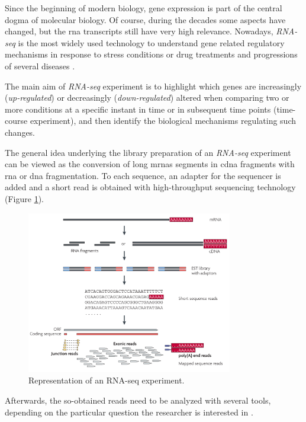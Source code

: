 Since the beginning of modern biology, gene expression is part of the central dogma of molecular biology.
Of course, during the decades some aspects have changed, but the \gls{rna} transcripts still have very high relevance.
Nowadays, \textit{RNA-seq} \cite{Thermes2014, Wang2009, Costa2010, Ozsolak2011} is the most widely used technology to understand gene related regulatory mechanisms in response to stress conditions or drug treatments and progressions of several diseases \cite{Costa2013}.

The main aim of \textit{RNA-seq} experiment is to highlight which genes are increasingly (\textit{up-regulated}) or decreasingly (\textit{down-regulated}) altered when comparing two or more conditions at a specific instant in time or in subsequent time points (time-course experiment), and then identify the biological mechanisms regulating such changes.

The general idea underlying the library preparation of an \textit{RNA-seq} experiment can be viewed as the conversion of long \glspl{mrna} segments in \gls{cdna} fragments with \gls{rna} or \gls{dna} fragmentation. 
To each sequence, an adapter for the sequencer is added and a short read is obtained with high-throughput sequencing technology (Figure \ref{fig:rnaseqexp}).


\begin{figure}[h]
\centering
\includegraphics[width=9cm, keepaspectratio]{img/intro/rna-seq.png}
\caption[RNA-seq experiment]{Representation of an RNA-seq experiment. \cite{Wang2009}}
\label{fig:rnaseqexp}

\end{figure}

Afterwards, the so-obtained reads need to be analyzed with several tools, depending on the particular question the researcher is interested in \cite{Pepke2009, Oshlack2010}.

